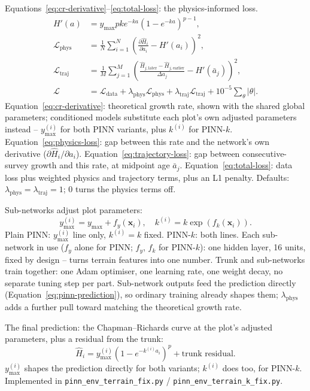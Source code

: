 Equations~\eqref{eq:cr-derivative}--\eqref{eq:total-loss}: the physics-informed loss.
\begin{align}
H'(a) &= y_{\max}pk e^{-ka}\left(1-e^{-ka}\right)^{p-1}, \label{eq:cr-derivative} \\
\mathcal{L}_{\mathrm{phys}} &= \frac{1}{N}\sum_{i=1}^{N}\left(\frac{\partial\hat H_i}{\partial a_i}-H'(a_i)\right)^2, \label{eq:physics-loss} \\
\mathcal{L}_{\mathrm{traj}} &= \frac{1}{M}\sum_{j=1}^{M}\left(\frac{\hat H_{j,\mathrm{later}}-\hat H_{j,\mathrm{earlier}}}{\Delta a_j}-H'(\bar a_j)\right)^2, \label{eq:trajectory-loss} \\
\mathcal{L} &= \mathcal{L}_{\mathrm{data}} + \lambda_{\mathrm{phys}}\mathcal{L}_{\mathrm{phys}} + \lambda_{\mathrm{traj}}\mathcal{L}_{\mathrm{traj}} + 10^{-5}\sum_{\theta}|\theta|. \label{eq:total-loss}
\end{align}
Equation~\eqref{eq:cr-derivative}: theoretical growth rate, shown with the shared global parameters; conditioned models substitute each plot's own adjusted parameters instead -- $y_{\max}^{(i)}$ for both PINN variants, plus $k^{(i)}$ for PINN-$k$. Equation~\eqref{eq:physics-loss}: gap between this rate and the network's own derivative ($\partial\hat H_i/\partial a_i$). Equation~\eqref{eq:trajectory-loss}: gap between consecutive-survey growth and this rate, at midpoint age $\bar a_j$. Equation~\eqref{eq:total-loss}: data loss plus weighted physics and trajectory terms, plus an L1 penalty. Defaults: $\lambda_{\mathrm{phys}}=\lambda_{\mathrm{traj}}=1$; 0 turns the physics terms off.

Sub-networks adjust plot parameters:
\begin{equation}
y_{\max}^{(i)} = y_{\max}+f_y(\mathbf{x}_i), \quad k^{(i)} = k\exp\!\left(f_k(\mathbf{x}_i)\right).
\label{eq:param-adjust}
\end{equation}
Plain PINN: $y_{\max}^{(i)}$ line only, $k^{(i)}=k$ fixed. PINN-$k$: both lines. Each sub-network in use ($f_y$ alone for PINN; $f_y$, $f_k$ for PINN-$k$): one hidden layer, 16 units, fixed by design -- turns terrain features into one number. Trunk and sub-networks train together: one Adam optimiser, one learning rate, one weight decay, no separate tuning step per part. Sub-network outputs feed the prediction directly (Equation~\eqref{eq:pinn-prediction}), so ordinary training already shapes them; $\lambda_{\mathrm{phys}}$ adds a further pull toward matching the theoretical growth rate.

The final prediction: the Chapman--Richards curve at the plot's adjusted parameters, plus a residual from the trunk:
\begin{equation}
\hat H_i = y_{\max}^{(i)}\left(1-e^{-k^{(i)}a_i}\right)^{p} + \text{trunk residual}.
\label{eq:pinn-prediction}
\end{equation}
$y_{\max}^{(i)}$ shapes the prediction directly for both variants; $k^{(i)}$ does too, for PINN-$k$. Implemented in \texttt{pinn\_env\_terrain\_fix.py} / \texttt{pinn\_env\_terrain\_k\_fix.py}.

